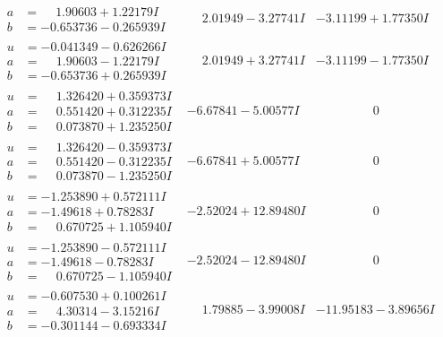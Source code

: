 \documentclass[1p]{elsarticle_modified}
\theoremstyle{definition}
\begin{document}
$$\begin{array}{c|c|c}
\begin{aligned}
a &= \phantom{-}1.90603 + 1.22179 I \\
b &= -0.653736 - 0.265939 I\end{aligned}
 & \phantom{-}2.01949 - 3.27741 I & -3.11199 + 1.77350 I \\ \hline\begin{aligned}
u &= -0.041349 - 0.626266 I \\
a &= \phantom{-}1.90603 - 1.22179 I \\
b &= -0.653736 + 0.265939 I\end{aligned}
 & \phantom{-}2.01949 + 3.27741 I & -3.11199 - 1.77350 I \\ \hline\begin{aligned}
u &= \phantom{-}1.326420 + 0.359373 I \\
a &= \phantom{-}0.551420 + 0.312235 I \\
b &= \phantom{-}0.073870 + 1.235250 I\end{aligned}
 & -6.67841 - 5.00577 I & \phantom{-0.000000 } 0 \\ \hline\begin{aligned}
u &= \phantom{-}1.326420 - 0.359373 I \\
a &= \phantom{-}0.551420 - 0.312235 I \\
b &= \phantom{-}0.073870 - 1.235250 I\end{aligned}
 & -6.67841 + 5.00577 I & \phantom{-0.000000 } 0 \\ \hline\begin{aligned}
u &= -1.253890 + 0.572111 I \\
a &= -1.49618 + 0.78283 I \\
b &= \phantom{-}0.670725 + 1.105940 I\end{aligned}
 & -2.52024 + 12.89480 I & \phantom{-0.000000 } 0 \\ \hline\begin{aligned}
u &= -1.253890 - 0.572111 I \\
a &= -1.49618 - 0.78283 I \\
b &= \phantom{-}0.670725 - 1.105940 I\end{aligned}
 & -2.52024 - 12.89480 I & \phantom{-0.000000 } 0 \\ \hline\begin{aligned}
u &= -0.607530 + 0.100261 I \\
a &= \phantom{-}4.30314 - 3.15216 I \\
b &= -0.301144 - 0.693334 I\end{aligned}
 & \phantom{-}1.79885 - 3.99008 I & -11.95183 - 3.89656 I \\ \hline\begin{aligned}

\end{aligned}
\end{array}$$
\end{document}

